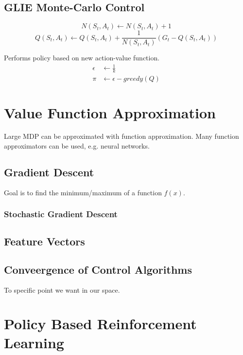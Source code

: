 \subsection{GLIE Monte-Carlo Control}\label{subsec:glie-monte-carlo-control}
\[
    N(S_t,A_t) \leftarrow N(S_t,A_t) + 1
\]
\[
    Q(S_t,A_t) \leftarrow Q(S_t,A_t) + \frac{1}{N(S_t,A_t)}\left(G_t - Q(S_t,A_t)\right)
\]


Performs policy based on new action-value function.
\begin{align}
    \epsilon &\leftarrow \frac{1}{k} \\
    \pi &\leftarrow \epsilon-greedy(Q)
\end{align}



\section{Value Function Approximation}\label{sec:value-function-approximation}
Large MDP can be approximated with function approximation.
Many function approximators can be used, e.g. neural networks.

\subsection{Gradient Descent}\label{subsec:gradient-descent}
Goal is to find the minimum/maximum of a function $f(x)$.

\subsubsection{Stochastic Gradient Descent}\label{subsubsec:stochastic-gradient-descent}

\subsection{Feature Vectors}\label{subsec:feature-vectors}

\subsection{Conveergence of Control Algorithms}\label{subsec:convergence-of-control-algorithms}
To specific point we want in our space.


\section{Policy Based Reinforcement Learning}\label{sec:policy-based-reinforcement-learning}

